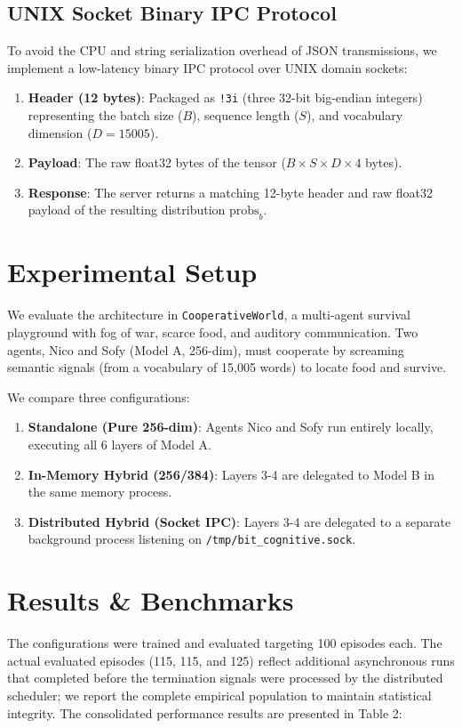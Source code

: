 \documentclass{article}
\begin{document}
\subsection{UNIX Socket Binary IPC Protocol}
To avoid the CPU and string serialization overhead of JSON transmissions, we implement a low-latency binary IPC protocol over UNIX domain sockets:
\begin{enumerate}
	\item \textbf{Header (12 bytes)}: Packaged as \texttt{!3i} (three 32-bit big-endian integers) representing the batch size ($B$), sequence length ($S$), and vocabulary dimension ($D = 15005$).
	\item \textbf{Payload}: The raw float32 bytes of the tensor ($B \times S \times D \times 4$ bytes).
	\item \textbf{Response}: The server returns a matching 12-byte header and raw float32 payload of the resulting distribution $\text{probs}_b$.
\end{enumerate}

\section{Experimental Setup}

We evaluate the architecture in \texttt{CooperativeWorld}, a multi-agent survival playground with fog of war, scarce food, and auditory communication. Two agents, Nico and Sofy (Model A, 256-dim), must cooperate by screaming semantic signals (from a vocabulary of 15,005 words) to locate food and survive.

We compare three configurations:
\begin{enumerate}
	\item \textbf{Standalone (Pure 256-dim)}: Agents Nico and Sofy run entirely locally, executing all 6 layers of Model A.
	\item \textbf{In-Memory Hybrid (256/384)}: Layers 3-4 are delegated to Model B in the same memory process.
	\item \textbf{Distributed Hybrid (Socket IPC)}: Layers 3-4 are delegated to a separate background process listening on \texttt{/tmp/bit\_cognitive.sock}.
\end{enumerate}

\section{Results \& Benchmarks}

The configurations were trained and evaluated targeting 100 episodes each. The actual evaluated episodes (115, 115, and 125) reflect additional asynchronous runs that completed before the termination signals were processed by the distributed scheduler; we report the complete empirical population to maintain statistical integrity. The consolidated performance results are presented in Table 2:
\end{document}

